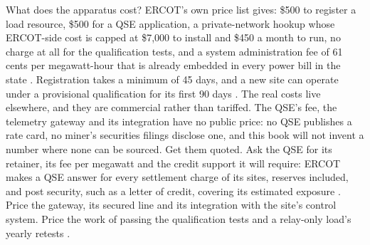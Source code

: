 What does the apparatus cost? ERCOT's own price list gives: \$500 to register a load resource, \$500 for a QSE application, a private-network hookup whose ERCOT-side cost is capped at \$7,000 to install and \$450 a month to run, no charge at all for the qualification tests, and a system administration fee of 61 cents per megawatt-hour that is already embedded in every power bill in the state \autocite{ercotfeeschedule2025,ercotsaf2026}. %
Registration takes a minimum of 45 days, and a new site can operate under a provisional qualification for its first 90 days \autocite{ercotlaar,ercot2026protocols}. %
The real costs live elsewhere, and they are commercial rather than tariffed. The QSE's fee, the telemetry gateway and its integration have no public price: no QSE publishes a rate card, no miner's securities filings disclose one, and this book will not invent a number where none can be sourced. Get them quoted. %
Ask the QSE for its retainer, its fee per megawatt and the credit support it will require: ERCOT makes a QSE answer for every settlement charge of its sites, reserves included, and post security, such as a letter of credit, covering its estimated exposure \autocite{ercot2026protocols}. %
Price the gateway, its secured line and its integration with the site's control system. Price the work of passing the qualification tests and a relay-only load's yearly retests \autocite{ercotnclrtest2026}. %
